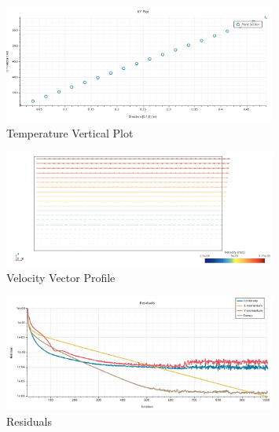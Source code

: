 \begin{figure}[h]
    \centering
    \includegraphics[width=0.8\textwidth]{Questions/Figures/Temperature Vertical Plot.png}
    \caption{Temperature Vertical Plot}
    \label{fig:Temperature Vertical Plot}
\end{figure}
\begin{figure}[h]
    \centering
    \includegraphics[width=0.8\textwidth]{Questions/Figures/Velocity Vector Profile.png}
    \caption{Velocity Vector Profile}
    \label{fig:Velocity Vector Profile}
\end{figure}
\begin{figure}[h]
    \centering
    \includegraphics[width=0.8\textwidth]{Questions/Figures/Residuals.png}
    \caption{Residuals}
    \label{fig:Residuals}
\end{figure}
\FloatBarrier
